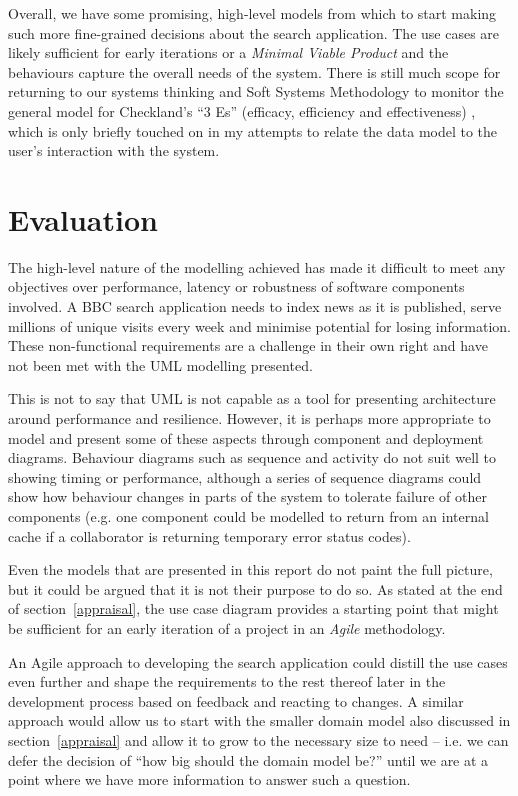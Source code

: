 \documentclass[oribibl]{llncs}
\begin{document}
Overall, we have some promising, high-level models from which to
start making such more fine-grained decisions about the search
application. The use cases are likely sufficient for early iterations
or a \emph{Minimal Viable Product} \citep{junk2000dynamic} and
the behaviours capture the overall needs of the system. There is still
much scope for returning to our systems thinking and Soft Systems
Methodology to monitor the general model for Checkland's ``3 Es''
(efficacy, efficiency and effectiveness) \citep{checkland1990soft},
which is only briefly touched on in my attempts to relate the
data model to the user's interaction with the system.

\section{Evaluation}
\label{evaluation}

The high-level nature of the modelling achieved has made it
difficult to meet any objectives over performance, latency or
robustness of software components involved. A BBC search application
needs to index news as it is published, serve millions of unique
visits every week and minimise potential for losing information. These
non-functional requirements are a challenge in their own right
and have not been met with the UML modelling presented.

This is not to say that UML is not capable as a tool for presenting
architecture around performance and resilience. However, it is perhaps
more appropriate to model and present some of these aspects through
component and deployment diagrams. Behaviour diagrams such as sequence
and activity do not suit well to showing timing or performance, although
a series of sequence diagrams could show how behaviour changes
in parts of the system to tolerate failure of other components (e.g.
one component could be modelled to return from an internal cache if
a collaborator is returning temporary error status codes).

Even the models that are presented in this report do not paint the full
picture, but it could be argued that it is not their purpose to do so.
As stated at the end of section~\ref{appraisal}, the use case diagram
provides a starting point that might be sufficient for an early
iteration of a project in an \emph{Agile} methodology. \citep{beck2001agile}

An Agile approach to developing the search application could distill
the use cases even further and shape the requirements to the rest
thereof later in the development process based on feedback and reacting
to changes. A similar approach would allow us to start with the smaller
domain model also discussed in section~\ref{appraisal} and allow it to grow
to the necessary size to need -- i.e. we can defer the decision of ``how big
should the domain model be?'' until we are at a point where we have more
information to answer such a question.
\end{document}
